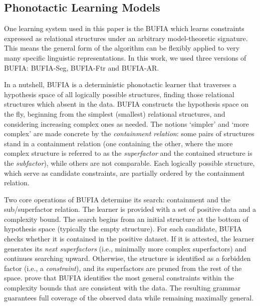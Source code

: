 \documentclass[11pt]{article}
\begin{document}
\subsection{Phonotactic Learning Models}

One learning system used in this paper is the BUFIA \citep{chandleeBufia2019} which learns constraints expressed as relational structures under an arbitrary
model-theoretic signature.
This means the general form of the algorithm can be flexibly applied to very
many specific linguistic representations.
In this work, we used three versions of BUFIA: BUFIA-Seg, BUFIA-Ftr and
BUFIA-AR.

In a nutshell, BUFIA is a deterministic phonotactic learner that 
traverses a hypothesis space of all logically possible structures, 
finding those relational structures which absent in the data.
BUFIA constructs the hypothesis space on the fly,
beginning from the simplest (smallest) relational structures,
and considering increasing complex ones as needed.
The notions `simpler' and `more complex' are made concrete by the
\textit{containment relation}: some pairs of structures stand in a 
containment relation (one containing the other, where the more complex 
structure is referred to as the \textit{superfactor} and the contained 
structure is the \textit{subfactor}), while others are not comparable.
Each logically possible structure, which serve as candidate constraints, 
are partially ordered by the containment relation.
%

Two core operations of BUFIA determine its search: containment and the 
sub/superfactor relation. The learner is provided with a set of positive 
data and a complexity bound. The search begins from an initial structure 
at the bottom of hypothesis space (typically the empty structure).
For each candidate, BUFIA checks whether it is contained in the positive
dataset. If it is attested, the learner generates its \textit{next
        superfactors} (i.e., minimally more complex superfactors) and
        continues searching upward.
Otherwise, the structure is identified as a forbidden factor (i.e., a
\textit{constraint}), and its superfactors are pruned from the rest of the 
space. \citet{chandleeBufia2019} prove that BUFIA identifies the most 
general constraints within the complexity bounds that are consistent with 
the data. The resulting grammar guarantees full coverage of the observed 
data while remaining maximally general.
\end{document}
